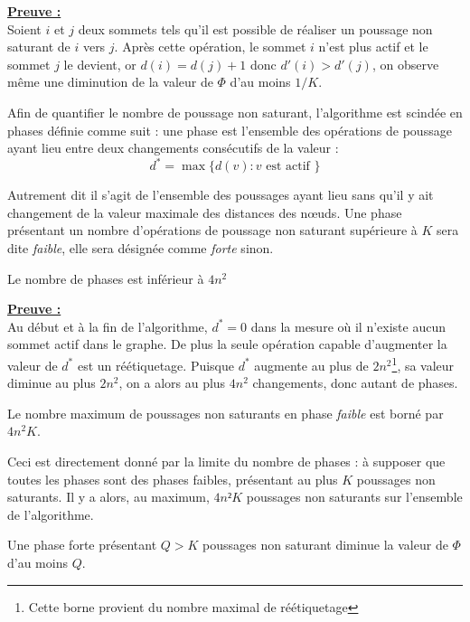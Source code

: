 \underline{\textbf{Preuve :}}\\
Soient $i$ et $j$ deux sommets tels qu'il est possible de réaliser un poussage non saturant de $i$
vers $j$.  Après cette opération, le sommet $i$ n'est plus actif et le sommet $j$ le devient, or
$d(i) = d(j) + 1$ donc $d'(i) > d'(j)$, on observe même une diminution de la valeur de $\Phi$ d'au
moins $1/K$.

Afin de quantifier le nombre de poussage non saturant, l'algorithme est scindée en phases définie
comme suit : une phase est l'ensemble des opérations de poussage ayant lieu entre deux changements
consécutifs de la valeur :
\begin{equation}
	d^* = \max\{d(v) : v \mbox{ est actif }\}
\end{equation}

Autrement dit il s'agit de l'ensemble des poussages ayant lieu sans qu'il y ait changement de la
valeur maximale des distances des n\oe uds.
Une phase présentant un nombre d'opérations de poussage non saturant supérieure à $K$ sera dite
\emph{faible}, elle sera désignée comme \emph{forte} sinon.

\begin{lemma}
	Le nombre de phases est inférieur à $4n^2$
\end{lemma}

\underline{\textbf{Preuve :}}\\
Au début et à la fin de l'algorithme, $d^* = 0$ dans la mesure où il n'existe aucun sommet actif
dans le graphe. De plus la seule opération capable d'augmenter la valeur de $d^*$ est un
réétiquetage. Puisque $d^*$ augmente au plus de $2n^2$\footnote{Cette borne provient du nombre maximal
de réétiquetage}, sa valeur diminue au plus $2n^2$, on a alors au plus $4n^2$ changements, donc
autant de phases.

\begin{corol}
	Le nombre maximum de poussages non saturants en phase \emph{faible} est borné par $4n^2K$.
\end{corol}

Ceci est directement donné par la limite du nombre de phases : à supposer que toutes les phases
sont des phases faibles, présentant au plus $K$ poussages non saturants. Il y a alors, au maximum,
$4n²K$ poussages non saturants sur l'ensemble de l'algorithme.

\begin{lemma}
	Une phase forte présentant $Q>K$ poussages non saturant diminue la valeur de $\Phi$ d'au moins
	$Q$.
\end{lemma}

